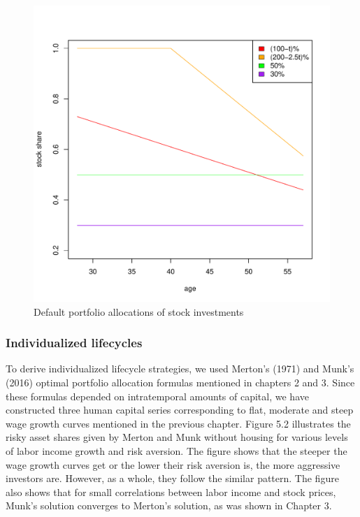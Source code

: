 \documentclass[]{elsarticle}
\begin{document}
\begin{figure}[h]
	\centering
	\includegraphics[scale=0.6]{figs/defaults.pdf}
	\caption{Default portfolio allocations of stock investments}
\end{figure}


\subsubsection{Individualized lifecycles}

To derive individualized lifecycle strategies, we used Merton's (1971) and Munk's (2016) optimal portfolio allocation formulas mentioned in chapters 2 and 3. Since these formulas depended on intratemporal amounts of capital, we have constructed three human capital series corresponding to flat, moderate and steep wage growth curves mentioned in the previous chapter. Figure 5.2 illustrates the risky asset shares given by Merton and Munk without housing for various levels of labor income growth and risk aversion. The figure shows that the steeper the wage growth curves get or the lower their risk aversion is, the more aggressive investors are. However, as a whole, they follow the similar pattern. The figure also shows that for small correlations between labor income and stock prices, Munk's solution converges to Merton's solution, as was shown in Chapter 3.
\end{document}
